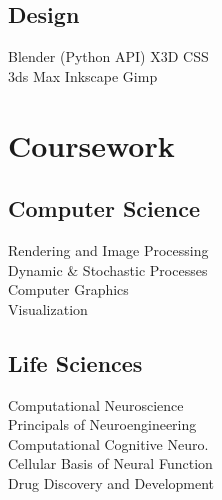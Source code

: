 \documentclass[]{deedy-resume-openfont}
\begin{document}
\begin{minipage}[t]{0.33\textwidth}
\subsection{Design}
Blender (Python API) \textbullet{} X3D \textbullet{} CSS \\ 
3ds Max \textbullet{} Inkscape \textbullet{} Gimp \\
\sectionsep


\section{Coursework}
\subsection{Computer Science}
Rendering and Image Processing \\
Dynamic \& Stochastic Processes \\
Computer Graphics \\
Visualization \\
\sectionsep

\subsection{Life Sciences}
Computational Neuroscience \\
Principals of Neuroengineering \\
Computational Cognitive Neuro. \\
Cellular Basis of Neural Function \\
Drug Discovery and Development \\
\sectionsep

%
%

\end{minipage} 
\hfill
\end{document}
